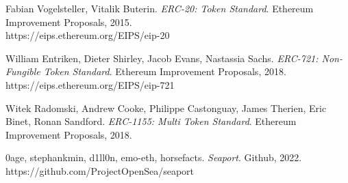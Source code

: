 \documentclass[12pt]{article}
\begin{document}
\begin{thebibliography}{9}
Fabian Vogelsteller, Vitalik Buterin. 
\textit{ERC-20: Token Standard}. 
Ethereum Improvement Proposals, 2015.\\
https://eips.ethereum.org/EIPS/eip-20

 William Entriken, Dieter Shirley, Jacob Evans, Nastassia Sachs. 
\textit{ERC-721: Non-Fungible Token Standard}. 
Ethereum Improvement Proposals, 2018.\\
https://eips.ethereum.org/EIPS/eip-721

Witek Radomski, Andrew Cooke, Philippe Castonguay, James Therien, Eric Binet, Ronan Sandford. 
\textit{ERC-1155: Multi Token Standard}. 
Ethereum Improvement Proposals, 2018.

0age, stephankmin, d1ll0n, emo-eth, horsefacts. 
\textit{Seaport}. 
Github, 2022.\\
https://github.com/ProjectOpenSea/seaport

\end{thebibliography}
\end{document}
